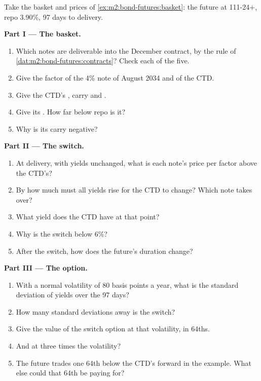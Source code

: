 \begin{problem}\label{pb:m2:bond-futures:1}
Take the basket and prices of \cref{ex:m2:bond-futures:basket}: the future at
111-24+, repo 3.90\%, 97 days to delivery.

\medskip\noindent\textbf{Part I --- The basket.}
\begin{enumerate}
\item Which notes are deliverable into the December contract, by the rule of
\cref{dat:m2:bond-futures:contracts}? Check each of the five.
\item Give the factor of the 4\% note of August 2034 and of the CTD.
\item Give the CTD's , carry and .
\item Give its . How far below repo is it?
\item Why is its carry negative?
\end{enumerate}

\medskip\noindent\textbf{Part II --- The switch.}
\begin{enumerate}[resume]
\item At delivery, with yields unchanged, what is each note's price per
factor above the CTD's?
\item By how much must all yields rise for the CTD to change? Which note takes
over?
\item What yield does the CTD have at that point?
\item Why is the switch below 6\%?
\item After the switch, how does the future's duration change?
\end{enumerate}

\medskip\noindent\textbf{Part III --- The option.}
\begin{enumerate}[resume]
\item With a normal volatility of 80 basis points a year, what is the standard
deviation of yields over the 97 days?
\item How many standard deviations away is the switch?
\item Give the value of the switch option at that volatility, in 64ths.
\item And at three times the volatility?
\item The future trades one 64th below the CTD's forward in the example. What
else could that 64th be paying for?
\end{enumerate}


\end{problem}
